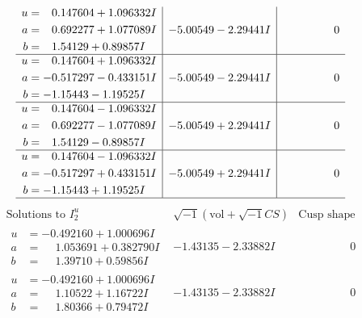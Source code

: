 \documentclass[1p]{elsarticle_modified}
\theoremstyle{definition}
\newcommand{\I}{\sqrt{-1}}
\begin{document}
$$\begin{array}{c|c|c}
\begin{aligned}
u &= \phantom{-}0.147604 + 1.096332 I \\
a &= \phantom{-}0.692277 + 1.077089 I \\
b &= \phantom{-}1.54129 + 0.89857 I\end{aligned}
 & -5.00549 - 2.29441 I & \phantom{-0.000000 } 0 \\ \hline\begin{aligned}
u &= \phantom{-}0.147604 + 1.096332 I \\
a &= -0.517297 - 0.433151 I \\
b &= -1.15443 - 1.19525 I\end{aligned}
 & -5.00549 - 2.29441 I & \phantom{-0.000000 } 0 \\ \hline\begin{aligned}
u &= \phantom{-}0.147604 - 1.096332 I \\
a &= \phantom{-}0.692277 - 1.077089 I \\
b &= \phantom{-}1.54129 - 0.89857 I\end{aligned}
 & -5.00549 + 2.29441 I & \phantom{-0.000000 } 0 \\ \hline\begin{aligned}
u &= \phantom{-}0.147604 - 1.096332 I \\
a &= -0.517297 + 0.433151 I \\
b &= -1.15443 + 1.19525 I\end{aligned}
 & -5.00549 + 2.29441 I & \phantom{-0.000000 } 0\\
 \hline 
 \end{array}$$\newpage$$\begin{array}{c|c|c}  
\text{Solutions to }I^u_{2}& \I (\text{vol} + \sqrt{-1}CS) & \text{Cusp shape}\\
 \hline 
\begin{aligned}
u &= -0.492160 + 1.000696 I \\
a &= \phantom{-}1.053691 + 0.382790 I \\
b &= \phantom{-}1.39710 + 0.59856 I\end{aligned}
 & -1.43135 - 2.33882 I & \phantom{-0.000000 } 0 \\ \hline\begin{aligned}
u &= -0.492160 + 1.000696 I \\
a &= \phantom{-}1.10522 + 1.16722 I \\
b &= \phantom{-}1.80366 + 0.79472 I\end{aligned}
 & -1.43135 - 2.33882 I & \phantom{-0.000000 } 0 \\ \hline\begin{aligned}

\end{aligned}
\end{array}$$
\end{document}
